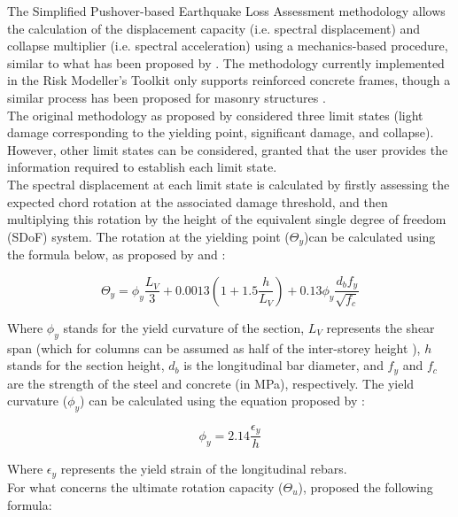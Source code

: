 The Simplified Pushover-based Earthquake Loss Assessment methodology \citep{BorziEtAl2008b} allows the calculation of the displacement capacity (i.e. spectral displacement) and collapse multiplier (i.e. spectral acceleration) using a mechanics-based procedure, similar to what has been proposed by \citet{CosenzaEtAl2005}. The methodology currently implemented in the Risk Modeller's Toolkit only supports reinforced concrete frames, though a similar process has been proposed for masonry structures \citep{BorziEtAl2008a}.\\

The original methodology as proposed by \citet{BorziEtAl2008b} considered three limit states (light damage corresponding to the yielding point, significant damage, and collapse). However, other limit states can be considered, granted that the user provides the information required to establish each limit state.\\

The spectral displacement at each limit state is calculated by firstly assessing the expected chord rotation at the associated damage threshold, and then multiplying this rotation by the height of the equivalent single degree of freedom (SDoF) system. The rotation at the yielding point ($\Theta_y$)can be calculated using the formula below, as proposed by \citet{CosenzaEtAl2005} and \citet{PanagiotakosFardis2001}:

\begin{equation}
	\Theta_y = \phi_y\frac{L_V}{3}+0.0013\left(1 + 1.5\frac{h}{L_V}\right)+0.13\phi_y\frac{d_bf_y}{\sqrt{f_c}}
\end{equation}

Where $\phi_y$ stands for the yield curvature of the section, $L_V$ represents the shear span (which for columns can be assumed as half of the inter-storey height \citep{BorziEtAl2008b}), $h$ stands for the section height, $d_b$ is the longitudinal bar diameter, and $f_y$ and $f_c$ are the strength of the steel and concrete (in MPa), respectively. The yield curvature ($\phi_y$) can be calculated using the equation proposed by \cite{PriestleyEtAl2007}:

\begin{equation}
	\phi_y = 2.14\frac{\epsilon_y}{h}
\end{equation}

Where $\epsilon_y$ represents the yield strain of the longitudinal rebars.\\

For what concerns the ultimate rotation capacity ($\Theta_u$), \cite{PanagiotakosFardis2001} proposed the following formula:


